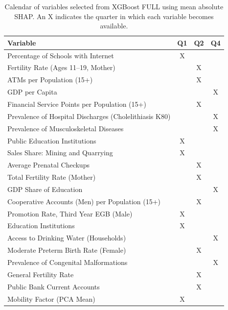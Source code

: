 \begin{table}[!htbp]
    \centering
    \footnotesize
    \renewcommand{\arraystretch}{1.05}
    \begin{tabular}{p{}ccc}
        \toprule
        \textbf{Variable} & \textbf{Q1} & \textbf{Q2} & \textbf{Q4} \\ \midrule
        Percentage of Schools with Internet & X &  &  \\
        Fertility Rate (Ages 11–19, Mother) &  & X &  \\
        ATMs per Population (15+) &  & X &  \\
        GDP per Capita &  &  & X \\
        Financial Service Points per Population (15+) &  & X &  \\
        Prevalence of Hospital Discharges (Cholelithiasis K80) &  &  & X \\
        Prevalence of Musculoskeletal Diseases &  &  & X \\
        Public Education Institutions & X &  &  \\
        Sales Share: Mining and Quarrying & X &  &  \\
        Average Prenatal Checkups &  & X &  \\
        Total Fertility Rate (Mother) &  & X &  \\
        GDP Share of Education &  &  & X \\
        Cooperative Accounts (Men) per Population (15+) &  & X &  \\
        Promotion Rate, Third Year EGB (Male) & X &  &  \\
        Education Institutions & X &  &  \\
        Access to Drinking Water (Households) &  &  & X \\
        Moderate Preterm Birth Rate (Female) &  & X &  \\
        Prevalence of Congenital Malformations &  &  & X \\
        General Fertility Rate &  & X &  \\
        Public Bank Current Accounts &  & X &  \\
        Mobility Factor (PCA Mean) & X &  &  \\
        \bottomrule
    \end{tabular}
    \caption{Calendar of variables selected from XGBoost FULL using mean absolute SHAP. An X indicates the quarter in which each variable becomes available.}
    \label{tab:calendar_variables_xgboost_full}
\end{table}
